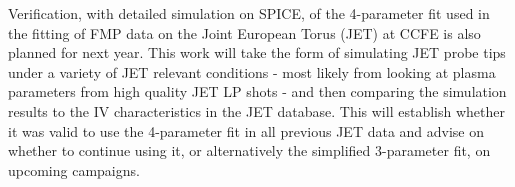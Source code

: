 \documentclass[a4paper, 12pt]{article} %
\begin{document}
	Verification, with detailed simulation on SPICE, of the 4-parameter fit used in the fitting of FMP data on the Joint European Torus (JET) at CCFE is also planned for next year.
	This work will take the form of simulating JET probe tips under a variety of JET relevant conditions - most likely from looking at plasma parameters from high quality JET LP shots - and then comparing the simulation results to the IV characteristics in the JET database. 
	This will establish whether it was valid to use the 4-parameter fit in all previous JET data and advise on whether to continue using it, or alternatively the simplified 3-parameter fit, on upcoming campaigns.


\end{document}
